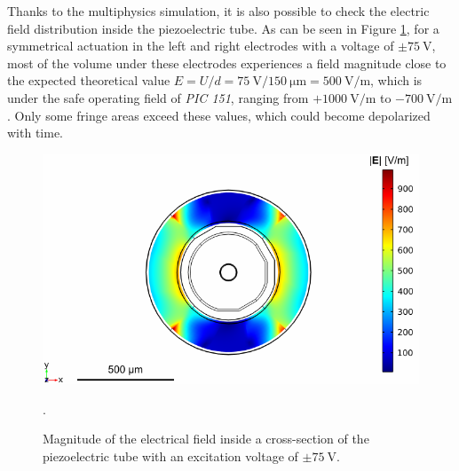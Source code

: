 Thanks to the multiphysics simulation, it is also possible to check the electric field distribution inside the piezoelectric tube. As can be seen in Figure \ref{fig:field}, for a symmetrical actuation in the left and right electrodes with a voltage of $\pm \SI{75}{\volt}$, most of the volume under these electrodes experiences a field magnitude close to the expected theoretical value $E=U/d = \SI{75}{\volt}/\SI{150}{\micro\meter} = \SI{500}{\volt/\meter}$, which is under the safe operating field of \textit{PIC 151}, ranging from $ +\SI{1000}{\volt/\meter}$ to $ -\SI{700}{\volt/\meter}$. Only some fringe areas exceed these values, which could become depolarized with time.
\begin{figure}[h!]\centering
      \includegraphics{figures/30_DesignSimulation/Mechanical/field.pdf}
      \caption{Magnitude of the electrical field inside a cross-section of the piezoelectric tube with an excitation voltage of $\pm \SI{75}{\volt}$.}.
      \label{fig:field}
\end{figure}






